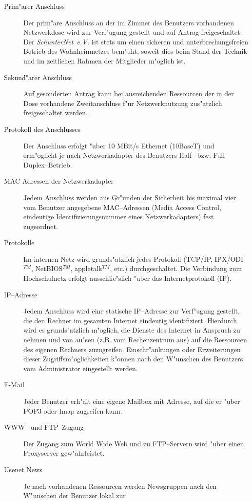 \documentclass[12pt,titlepage,twoside]{scrartcl}
\newcommand{\tm}{$^{TM}$}
\newcommand{\snev}{\emph{SchunterNet~e.V.} }
\begin{document}
\begin{appendix}
\begin{description}
  \item[Prim"arer Anschluss] Der prim"are Anschluss an
      der im Zimmer des Benutzers vorhandenen Netzwerkdose wird zur
      Verf"ugung gestellt und auf Antrag freigeschaltet. Der \snev
      ist stets um einen sicheren und unterbrechungsfreien Betrieb des
      Wohnheimnetzes bem"uht, soweit dies beim Stand der Technik und im
      zeitlichen Rahmen der Mitglieder m"oglich ist.
  \item[Sekund"arer Anschluss] Auf gesonderten Antrag
      kann bei ausreichenden Ressourcen der in der Dose vorhandene
      Zweitanschluss f"ur Netzwerknutzung zus"atzlich freigeschaltet
      werden.
  \item[Protokoll des Anschlusses]  Der Anschluss erfolgt "uber
      10 MBit/s Ethernet (10BaseT) und erm"oglicht je nach Netzwerkadapter des
      Benutzers Half-- bzw. Full--Duplex--Betrieb.
  \item[MAC Adressen der Netzwerkadapter] Jedem
      Anschluss werden aus Gr"unden der Sicherheit bis maximal vier vom
      Benutzer angegebene MAC--Adressen (Media Access Control,
      eindeutige Identifizierungsnummer eines Netzwerkadapters) fest
      zugeordnet.
  \item[Protokolle] Im internen Netz wird
      grunds"atzlich jedes Protokoll (TCP/IP, IPX/ODI\tm, NetBIOS\tm,
      appletalk\tm, etc.) durchgeschaltet. Die Verbindung zum
      Hochschulnetz erfolgt ausschlie"slich "uber das Internetprotokoll
      (IP).
  \item[IP--Adresse] Jedem Anschluss wird eine statische
      IP--Adresse zur Verf"u\-gung gestellt, die den Rechner im gesamten
      Internet eindeutig identifiziert. Hierdurch wird es grunds"atzlich
      m"oglich, die Dienste des Internet in Anspruch zu nehmen und von au"sen
      (z.B. vom Rechenzentrum aus) auf die Ressourcen des eigenen Rechners
      zuzugreifen. Einschr"ankungen oder Erweiterungen dieser
      Zugriffsm"oglichkeiten k"onnen nach den W"unschen des Benutzers vom
      Administrator eingestellt werden.
  \item[E-Mail] Jeder Benutzer erh"alt eine eigene
      Mailbox mit Adresse, auf die er "uber POP3 oder Imap zugreifen
      kann.
  \item[WWW-- und FTP--Zugang] Der Zugang zum
      World Wide Web und zu FTP--Servern wird "uber einen Proxyserver
      gew"ahrleistet.
  \item[Usenet News] Je nach vorhandenen Ressourcen
      werden Newsgruppen nach den W"un\-schen der Benutzer lokal zur

\end{description}
\end{appendix}
\end{document}
